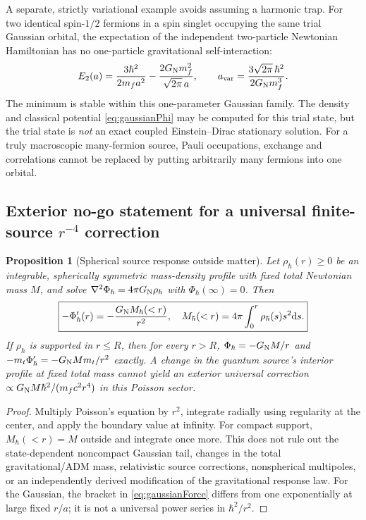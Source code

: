 \documentclass[11pt,a4paper,oneside]{report}
\numberwithin{equation}{chapter}
\newtheorem{proposition}[theorem]{Proposition}
\theoremstyle{definition}\newtheorem{definition}[theorem]{Definition}
\theoremstyle{remark}\newtheorem{remark}[theorem]{Remark}
\newcommand{\dd}{\mathrm d}
\begin{document}
A separate, strictly variational example avoids assuming a harmonic trap. For two identical spin-$1/2$ fermions in a spin singlet occupying the same trial Gaussian orbital, the expectation of the independent two-particle Newtonian Hamiltonian has no one-particle gravitational self-interaction:
\begin{equation}
 E_{2}(a)=\frac{3\hbar^2}{2m_fa^2}
 -\frac{2G_{\rm N}m_f^2}{\sqrt{2\pi}\,a},
 \qquad a_{\rm var}=\frac{3\sqrt{2\pi}\,\hbar^2}{2G_{\rm N}m_f^3}.
 \label{eq:twofermionvariational}
\end{equation}
The minimum is stable within this one-parameter Gaussian family. The density and classical potential \eqref{eq:gaussianPhi} may be computed for this trial state, but the trial state is \emph{not} an exact coupled Einstein--Dirac stationary solution. For a truly macroscopic many-fermion source, Pauli occupations, exchange and correlations cannot be replaced by putting arbitrarily many fermions into one orbital.

\subsection{Exterior no-go statement for a universal finite-source $r^{-4}$ correction}
\begin{proposition}[Spherical source response outside matter]\label{prop:gaussnoGo}
Let $\rho_\hbar(r)\geq0$ be an integrable, spherically symmetric mass-density profile with fixed total Newtonian mass $M$, and solve $\nabla^2\Phi_\hbar=4\pi G_{\rm N}\rho_\hbar$ with $\Phi_\hbar(\infty)=0$. Then
\begin{equation}
 \boxed{\displaystyle
 -\Phi_\hbar'(r)=-\frac{G_{\rm N}M_\hbar(<r)}{r^2},\quad
 M_\hbar(<r)=4\pi\int_0^r\rho_\hbar(s)s^2\dd s.}
 \label{eq:gaussquantum}
\end{equation}
If $\rho_\hbar$ is supported in $r\leq R$, then for every $r>R$,
$\Phi_\hbar=-G_{\rm N}M/r$ and $-m_t\Phi_\hbar'=-G_{\rm N}Mm_t/r^2$ exactly. A change in the quantum source's \emph{interior profile} at fixed total mass cannot yield an exterior universal correction $\propto G_{\rm N}M\hbar^2/(m_fc^2r^4)$ in this Poisson sector.
\end{proposition}
\begin{proof}
Multiply Poisson's equation by $r^2$, integrate radially using regularity at the center, and apply the boundary value at infinity. For compact support, $M_\hbar(<r)=M$ outside and integrate once more. This does not rule out the state-dependent noncompact Gaussian tail, changes in the total gravitational/ADM mass, relativistic source corrections, nonspherical multipoles, or an independently derived modification of the gravitational response law. For the Gaussian, the bracket in \eqref{eq:gaussianForce} differs from one exponentially at large fixed $r/a$; it is not a universal power series in $\hbar^2/r^2$.
\end{proof}
\end{document}
